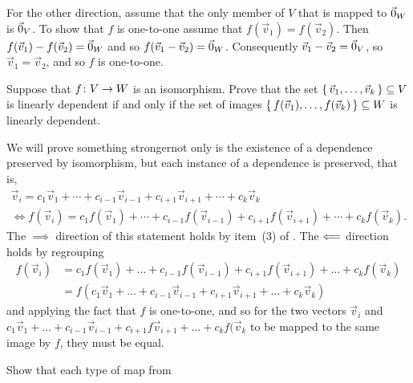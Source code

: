 \begin{exercises}
\begin{answer}
      For the other direction, assume that the only member of \( V \) 
      that is mapped to \( \vec{0}_W \) is \( \vec{0}_V \).
      To show that 
      \( f \) is one-to-one assume that \( f(\vec{v}_1)=f(\vec{v}_2) \).
      Then \( f(\vec{v}_1)-f(\vec{v}_2)=\vec{0}_W \) and so
      \( f(\vec{v}_1-\vec{v}_2)=\vec{0}_W \).
      Consequently \( \vec{v}_1-\vec{v}_2=\vec{0}_V \), so
      $\vec{v}_1=\vec{v}_2$, and so \( f \) is one-to-one.    
    \end{answer}
  \item 
    Suppose that \( \mbox{$f\colon V\to W$} \) is an isomorphism.
    Prove that the set 
    \( \mbox{$\{\,\vec{v}_1,\dots,\vec{v}_k\,\}$}\subseteq V \) is linearly
    dependent if and only if the set of images
    \( \mbox{$\{\,f(\vec{v}_1),\dots,f(\vec{v}_k)\,\}$}\subseteq W \)
    is linearly dependent.
    \begin{answer}
      We will prove something stronger\Dash not only is the existence of a
      dependence preserved by isomorphism, but each instance of a dependence is
      preserved, that is,
      \begin{multline*}
        \vec{v}_i=c_1\vec{v}_1+\cdots+c_{i-1}\vec{v}_{i-1}
                   +c_{i+1}\vec{v}_{i+1}+\cdots+c_k\vec{v}_k   \\
        \iff
        f(\vec{v}_i)=c_1f(\vec{v}_1)+\cdots+c_{i-1}f(\vec{v}_{i-1})
                     +c_{i+1}f(\vec{v}_{i+1})+\cdots+c_kf(\vec{v}_k).
      \end{multline*}
      The \( \implies \) direction of this statement holds by item~(3) of
      .
      The \( \Longleftarrow \) direction holds by regrouping
      \begin{align*}
         f(\vec{v}_i)
           &=c_1f(\vec{v}_1)+\dots+c_{i-1}f(\vec{v}_{i-1})
                     +c_{i+1}f(\vec{v}_{i+1})+\dots+c_kf(\vec{v}_k)  \\
           &=f(c_1\vec{v}_1+\dots+c_{i-1}\vec{v}_{i-1}
                     +c_{i+1}\vec{v}_{i+1}+\dots+c_k \vec{v}_k) 
      \end{align*}
      and applying the fact that $f$ is one-to-one, and so for the two
      vectors $\vec{v}_i$ and 
      $c_1\vec{v}_1+\dots+c_{i-1}\vec{v}_{i-1}
              +c_{i+1}f\vec{v}_{i+1}+\dots+c_kf(\vec{v}_k$
      to be mapped to the same image by $f$, they must be equal.
    \end{answer}
  \recommended \item \label{exer:RigidPlaneMapsAutos} 
    Show that each type of map from 

\end{exercises}
